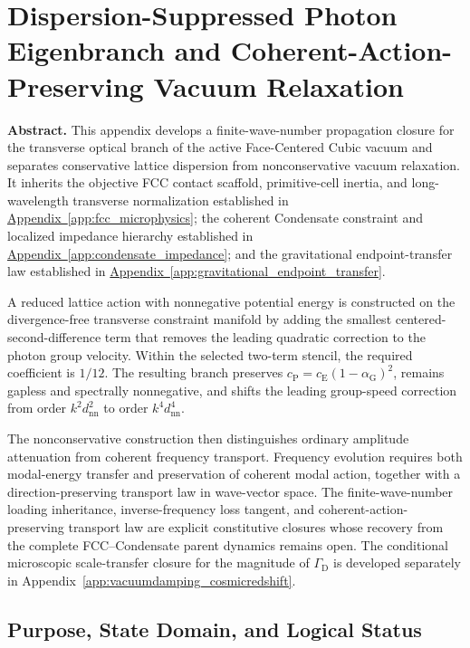 \chapter[Photon Eigenbranch and Vacuum Relaxation]
{Dispersion-Suppressed Photon Eigenbranch and Coherent-Action-Preserving Vacuum Relaxation}
\label{app:photon_dispersion_relaxation}

\noindent\textbf{Abstract.}
This appendix develops a finite-wave-number propagation closure for the
transverse optical branch of the active Face-Centered Cubic vacuum and
separates conservative lattice dispersion from nonconservative vacuum
relaxation. It inherits the objective FCC contact scaffold, primitive-cell
inertia, and long-wavelength transverse normalization established in
\hyperref[app:fcc_microphysics]{Appendix~\ref*{app:fcc_microphysics}}; the
coherent Condensate constraint and localized impedance hierarchy established
in
\hyperref[app:condensate_impedance]{Appendix~\ref*{app:condensate_impedance}};
and the gravitational endpoint-transfer law established in
\hyperref[app:gravitational_endpoint_transfer]
{Appendix~\ref*{app:gravitational_endpoint_transfer}}.

A reduced lattice action with nonnegative potential energy is constructed on
the divergence-free transverse constraint manifold by adding the smallest
centered-second-difference term that removes the leading quadratic correction
to the photon group velocity. Within the selected two-term stencil, the
required coefficient is \(1/12\). The resulting branch preserves
\(c_{\mathrm P}=c_{\mathrm E}(1-\alpha_{\mathrm G})^2\), remains gapless and
spectrally nonnegative, and shifts the leading group-speed correction from
order \(k^2d_{\mathrm{nn}}^2\) to order \(k^4d_{\mathrm{nn}}^4\).

The nonconservative construction then distinguishes ordinary amplitude
attenuation from coherent frequency transport. Frequency evolution requires
both modal-energy transfer and preservation of coherent modal action, together
with a direction-preserving transport law in wave-vector space. The
finite-wave-number loading inheritance, inverse-frequency loss tangent, and
coherent-action-preserving transport law are explicit constitutive closures
whose recovery from the complete FCC--Condensate parent dynamics remains open.
The conditional microscopic scale-transfer closure for the magnitude of
\(\Gamma_{\mathrm D}\) is developed separately in
Appendix~\ref{app:vacuumdamping_cosmicredshift}.


\section{Purpose, State Domain, and Logical Status}
\label{sec:photon_relaxation_scope}

